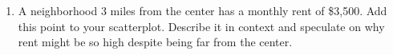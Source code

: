 \documentclass[10pt]{article}
\begin{document}
\begin{tcolorbox}[colback=white, colframe=black!40, boxrule=0.8pt, arc=2mm,
    left=4mm, right=4mm, top=3mm, bottom=3mm,
    title={\textbf{Tier E --- Extension}}, fonttitle=\bfseries, halign title=center]
\begin{enumerate}[leftmargin=1.6em, itemsep=0.18in]
  \item A neighborhood 3 miles from the center has a monthly rent of \$3{,}500. Add this
        point to your scatterplot. Describe it in context and speculate on why rent might
        be so high despite being far from the center.\\[8pt]
        \writeline\\[2pt]\writeline

\end{enumerate}
\end{tcolorbox}
\end{document}
